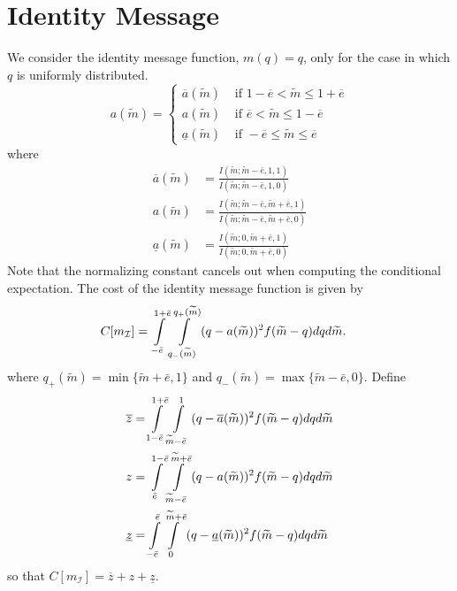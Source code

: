 \documentclass[12pt]{article}
\begin{document}
\section{Identity Message}
We consider the identity message function, $m(q)=q$, only for the case in which $q$ is uniformly distributed. 
\begin{equation}
	a(\widetilde{m})=
	\begin{cases}
		\overline{a}(\widetilde{m}) & \text{ if } 1-\overline{e}<\widetilde{m}\leq 1+\overline{e}\\
		a(\widetilde{m}) & \text{ if } \overline{e}<\widetilde{m}\leq 1-\overline{e}\\
		\underline{a}(\widetilde{m}) & \text{ if } -\overline{e}\leq\widetilde{m}\leq \overline{e}
	\end{cases}
\end{equation}
where
\begin{align}
	\overline{a}(\widetilde{m})&=\frac{I(\widetilde{m};\widetilde{m}-\bar{e},1,1)}{I(\widetilde{m};\widetilde{m}-\bar{e},1,0)}\\
	a(\widetilde{m})&=\frac{I(\widetilde{m};\widetilde{m}-\bar{e},\widetilde{m}+\bar{e},1)}{I(\widetilde{m};\widetilde{m}-\bar{e},\widetilde{m}+\bar{e},0)}\\
	\underline{a}(\widetilde{m})&=\frac{I(\widetilde{m};0,\widetilde{m}+\bar{e},1)}{I(\widetilde{m};0,\widetilde{m}+\bar{e},0)}
\end{align}
Note that the normalizing constant cancels out when computing the conditional expectation. The cost of the identity message function is given by
\begin{align}
	C[m_{\mathcal{I}}]&=\int\displaylimits_{-\bar{e}}^{1+\bar{e}}{\int\displaylimits_{q_{-}(\widetilde{m})}^{q_{+}(\widetilde{m})}{(q-a(\widetilde{m}))^{2}f(\widetilde{m}-q)dq}d\widetilde{m}}.
\end{align}
where $q_{+}(\widetilde{m})=\min\{\widetilde{m}+\bar{e},1\}$ and $q_{-}(\widetilde{m})=\max\{\widetilde{m}-\bar{e},0\}$. Define
\begin{align}
	\overline{z}&=\int\displaylimits_{1-\bar{e}}^{1+\bar{e}}{\int\displaylimits_{\widetilde{m}-\bar{e}}^{1}{(q-\overline{a}(\widetilde{m}))^{2}f(\widetilde{m}-q)dq}d\widetilde{m}}\\
	z&=\int\displaylimits_{\bar{e}}^{1-\bar{e}}{\int\displaylimits_{\widetilde{m}-\bar{e}}^{\widetilde{m}+\bar{e}}{(q-a(\widetilde{m}))^{2}f(\widetilde{m}-q)dq}d\widetilde{m}}\\
	\underline{z}&=\int\displaylimits_{-\bar{e}}^{\bar{e}}{\int\displaylimits_{0}^{\widetilde{m}+\bar{e}}{(q-\underline{a}(\widetilde{m}))^{2}f(\widetilde{m}-q)dq}d\widetilde{m}}
\end{align}
so that $C[m_{\mathcal{I}}]=\overline{z}+z+\underline{z}$.
\end{document}
